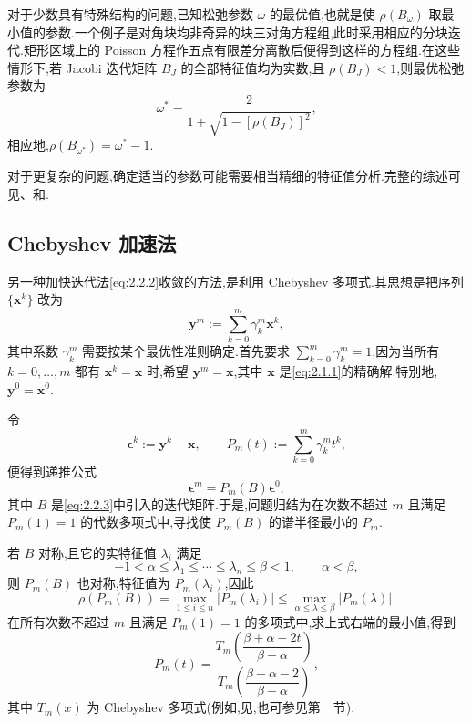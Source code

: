 对于少数具有特殊结构的问题,已知松弛参数 \(\omega\) 的最优值,也就是使 \(\rho(B_\omega)\) 取最小值的参数.一个例子是对角块均非奇异的块三对角方程组,此时采用相应的分块迭代.矩形区域上的 Poisson 方程作五点有限差分离散后便得到这样的方程组.在这些情形下,若 Jacobi 迭代矩阵 \(B_J\) 的全部特征值均为实数,且 \(\rho(B_J)<1\),则最优松弛参数为
\begin{equation}\label{eq:2.3.19}
  \omega^*=\frac2{1+\sqrt{1-[\rho(B_J)]^2}},
\end{equation}
相应地,\(\rho(B_{\omega^*})=\omega^*-1\).

对于更复杂的问题,确定适当的参数可能需要相当精细的特征值分析.完整的综述可见、和.

\subsection{Chebyshev 加速法}\label{sec:2.3.4}

另一种加快迭代法\eqref{eq:2.2.2}收敛的方法,是利用 Chebyshev 多项式.其思想是把序列 \(\{\boldsymbol{x}^k\}\) 改为
\begin{equation}\label{eq:2.3.20}
  \boldsymbol{y}^m:=\sum_{k=0}^m\gamma_k^m\boldsymbol{x}^k,
\end{equation}
其中系数 \(\gamma_k^m\) 需要按某个最优性准则确定.首先要求 \(\sum_{k=0}^m\gamma_k^m=1\),因为当所有 \(k=0,\ldots,m\) 都有 \(\boldsymbol{x}^k=\boldsymbol{x}\) 时,希望 \(\boldsymbol{y}^m=\boldsymbol{x}\),其中 \(\boldsymbol{x}\) 是\eqref{eq:2.1.1}的精确解.特别地,\(\boldsymbol{y}^0=\boldsymbol{x}^0\).

令
\[
  \boldsymbol{\epsilon}^k:=\boldsymbol{y}^k-\boldsymbol{x},\qquad
  P_m(t):=\sum_{k=0}^m\gamma_k^m t^k,
\]
便得到递推公式
\begin{equation}\label{eq:2.3.21}
  \boldsymbol{\epsilon}^m=P_m(B)\boldsymbol{\epsilon}^0,
\end{equation}
其中 \(B\) 是\eqref{eq:2.2.3}中引入的迭代矩阵.于是,问题归结为在次数不超过 \(m\) 且满足 \(P_m(1)=1\) 的代数多项式中,寻找使 \(P_m(B)\) 的谱半径最小的 \(P_m\).

若 \(B\) 对称,且它的实特征值 \(\lambda_i\) 满足
\[
  -1<\alpha\le\lambda_1\le\cdots\le\lambda_n\le\beta<1,\qquad \alpha<\beta,
\]
则 \(P_m(B)\) 也对称,特征值为 \(P_m(\lambda_i)\),因此
\begin{equation}\label{eq:2.3.22}
  \rho(P_m(B))=\max_{1\le i\le n}|P_m(\lambda_i)|
    \le \max_{\alpha\le\lambda\le\beta}|P_m(\lambda)|.
\end{equation}
在所有次数不超过 \(m\) 且满足 \(P_m(1)=1\) 的多项式中,求上式右端的最小值,得到
\[
  P_m(t)=\frac{T_m\!\left(\dfrac{\beta+\alpha-2t}{\beta-\alpha}\right)}
              {T_m\!\left(\dfrac{\beta+\alpha-2}{\beta-\alpha}\right)},
\]
其中 \(T_m(x)\) 为 Chebyshev 多项式(例如,见,也可参见第~~节).

